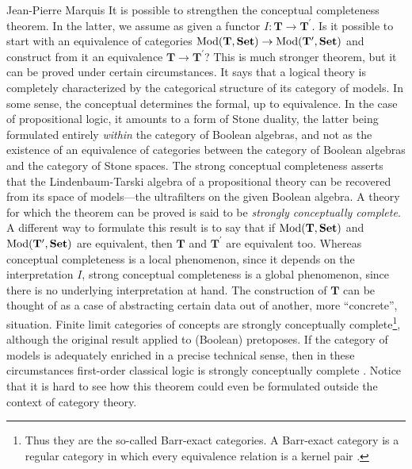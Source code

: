 \begin{artengenv}{Jean-Pierre Marquis}
It is possible to strengthen the conceptual completeness theorem. In the latter, we assume as given a functor \( I:  \mathbf{T} \to \mathbf{T}^{\prime} \). Is it possible to start with an equivalence of categories \( \operatorname{\mathrm{Mod}}(\mathbf{T}, \mathbf{Set}) \to \operatorname{\mathrm{Mod}}(\mathbf{T}^{\prime}, \mathbf{Set}) \) and construct from it an equivalence \(  \mathbf{T} \to \mathbf{T}^{\prime} \)? This is  much stronger theorem, but it can be proved under certain circumstances. It says that a logical theory is completely characterized by the categorical structure of its category of models. In some sense, the conceptual determines the formal, up to equivalence. In the case of propositional logic, it amounts to a form of Stone duality, the latter being formulated entirely \emph{within} the category of Boolean algebras, and not as the existence of an equivalence of categories between the category of Boolean algebras and the category of Stone spaces. The strong conceptual completeness asserts that the Lindenbaum-Tarski algebra of a propositional theory can be recovered from its space of models---the ultrafilters on the given Boolean algebra. A theory for which the theorem can be proved is said to be \textit{strongly conceptually complete}. A different way to formulate this result is to say that if \( \operatorname{\mathrm{Mod}}(\mathbf{T}, \mathbf{Set}) \) and \( \operatorname{\mathrm{Mod}}(\mathbf{T}^{\prime}, \mathbf{Set}) \) are equivalent, then \( \mathbf{T} \) and \( \mathbf{T}^{\prime} \) are equivalent too. Whereas conceptual completeness is a local phenomenon, since it depends on the interpretation \( I \), strong conceptual completeness is a global phenomenon, since there is no underlying interpretation at hand. The construction of \( \mathbf{T} \) can be thought of as a case of abstracting certain data out of another, more ``concrete'', situation. Finite limit categories of concepts are strongly conceptually complete\footnote{Thus they are the so-called Barr-exact categories. A Barr-exact category is a regular category in which every equivalence relation is a kernel pair \parencite[see][]{Makkai1990}.}, although the original result applied to (Boolean) pretoposes. If the category of models is adequately enriched in a precise technical sense, then in these circumstances first-order classical logic is strongly conceptually complete \parencites[see][]{Makkai1988}{Makkai1990}[for a a different proof which is build with higher-dimensional categories in mind, see][]{Lurie2019}.  Notice that it is hard to see how this theorem could even be formulated outside the context of category theory.


\end{artengenv}
